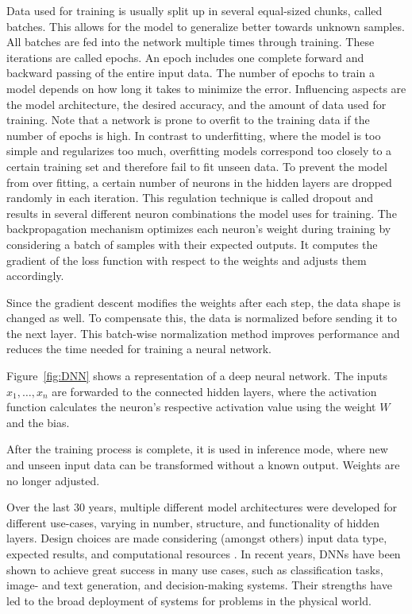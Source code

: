 Data used for training is usually split up in several equal-sized chunks, called batches. This allows for the model to generalize better towards unknown samples. All batches are fed into the network multiple times through training. These iterations are called epochs. An epoch includes one complete forward and backward passing of the entire input data.
The number of epochs to train a model depends on how long it takes to minimize the error. Influencing aspects are the model architecture, the desired accuracy, and the amount of data used for training.
Note that a network is prone to overfit to the training data if the number of epochs is high. In contrast to underfitting, where the model is too simple and regularizes too much, overfitting models correspond too closely to a certain training set and therefore fail to fit unseen data. To prevent the model from over fitting, a certain number of neurons in the hidden layers are dropped randomly in each iteration. This regulation technique is called dropout and results in several different neuron combinations the model uses for training. The backpropagation mechanism optimizes each neuron's weight during training by considering a batch of samples with their expected outputs. It computes the gradient of the loss function with respect to the weights and adjusts them accordingly. 

Since the gradient descent modifies the weights after each step, the data shape is changed as well. To compensate this, the data is normalized before sending it to the next layer. This batch-wise normalization method improves performance and reduces the time needed for training a neural network.

Figure~\ref{fig:DNN} shows a representation of a deep neural network. The inputs $x_1, \dots, x_n$ are forwarded to the connected hidden layers, where the activation function calculates the neuron's respective activation value using the weight $W$ and the bias.

After the training process is complete, it is used in inference mode, where new and unseen input data can be transformed without a known output. Weights are no longer adjusted.

Over the last 30 years, multiple different model architectures were developed for different use-cases, varying in number, structure, and functionality of hidden layers. Design choices are made considering (amongst others) input data type, expected results, and computational resources \cite{buduma2017fundamentals}. In recent years, DNNs have been shown to achieve great success in many use cases, such as classification tasks, image- and text generation, and decision-making systems. Their strengths have led to the broad deployment of systems for problems in the physical world. 

